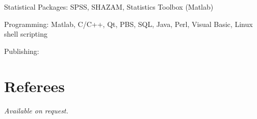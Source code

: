 \documentclass[margin,line]{resume}
\begin{document}
\begin{resume}
    \begin{list2}
        \item Statistical Packages:  SPSS, SHAZAM, Statistics Toolbox (Matlab)
        \item Programming: Matlab, C/C++, Qt, PBS, SQL, Java, Perl, Visual Basic, Linux shell scripting
        \item Publishing: \LaTeXe
    \end{list2}


    \section{\mysidestyle Referees} 

    {\sl Available on request.}


\end{resume}
\end{document}
